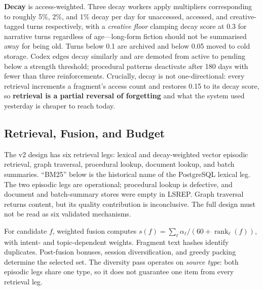 \documentclass[11pt,a4paper]{article}
\begin{document}
\textbf{Decay} is access-weighted. Three decay workers apply multipliers corresponding to roughly 5\%, 2\%, and 1\% decay per day for unaccessed, accessed, and creative-tagged turns respectively, with a \emph{creative floor} clamping decay score at 0.3 for narrative turns regardless of age---long-form fiction should not be summarised away for being old. Turns below 0.1 are archived and below 0.05 moved to cold storage. Codex edges decay similarly and are demoted from active to pending below a strength threshold; procedural patterns deactivate after 180 days with fewer than three reinforcements. Crucially, decay is not one-directional: every retrieval increments a fragment's access count and restores 0.15 to its decay score, so \textbf{retrieval is a partial reversal of forgetting} and what the system used yesterday is cheaper to reach today.

\subsection{Retrieval, Fusion, and Budget}
\label{sec:orchestrator}
The v2 design has six retrieval legs: lexical and decay-weighted vector episodic retrieval, graph traversal, procedural lookup, document lookup, and batch summaries. ``BM25'' below is the historical name of the PostgreSQL lexical leg. The two episodic legs are operational; procedural lookup is defective, and document and batch-summary stores were empty in LSREP. Graph traversal returns content, but its quality contribution is inconclusive. The full design must not be read as six validated mechanisms.

For candidate $f$, weighted fusion computes $s(f)=\sum_\ell\alpha_\ell/(60+\operatorname{rank}_\ell(f))$, with intent- and topic-dependent weights. Fragment text hashes identify duplicates. Post-fusion bonuses, session diversification, and greedy packing determine the selected set. The diversity pass operates on \emph{source type}: both episodic legs share one type, so it does not guarantee one item from every retrieval leg.
\end{document}
